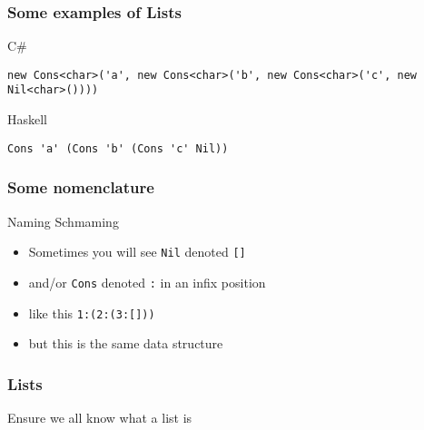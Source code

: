 \begin{frame}[fragile]
\frametitle{Some examples of Lists}
\begin{block}{C\#}
\begin{lstlisting}[style=csharp,basicstyle=\tiny\ttfamily,mathescape]
new Cons<char>('a', new Cons<char>('b', new Cons<char>('c', new Nil<char>())))
\end{lstlisting}
\end{block}
\begin{block}{Haskell}
\begin{lstlisting}[style=haskell,basicstyle=\scriptsize\ttfamily,mathescape]
Cons 'a' (Cons 'b' (Cons 'c' Nil))
\end{lstlisting}
\end{block}
\end{frame}

\begin{frame}
\frametitle{Some nomenclature}
\begin{block}{Naming Schmaming}
\begin{itemize}
\item<1-> Sometimes you will see \lstinline{Nil} denoted \lstinline{[]}
\item<2-> and/or \lstinline{Cons} denoted \lstinline{:} in an infix position
\item<3-> like this \lstinline{1:(2:(3:[]))}
\item<4-> but this is the same data structure
\end{itemize}
\end{block}
\end{frame}

\begin{frame}
\frametitle{Lists}
\begin{center}
Ensure we all know what a list is
\end{center}
\end{frame}
